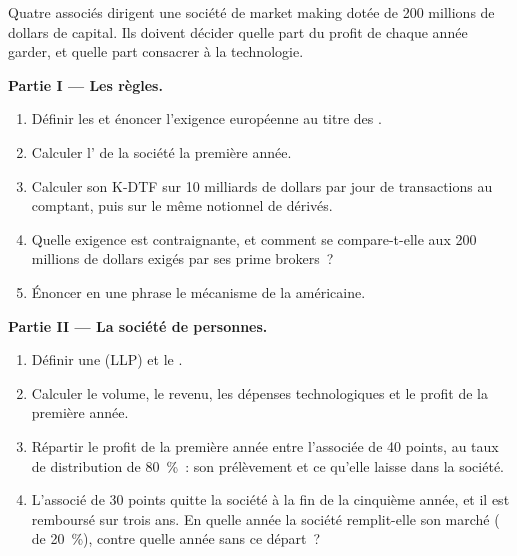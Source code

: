 \begin{problem}\label{pb:fm:the-proprietary-market-making-firm:1}
Quatre associés dirigent une société de market making dotée de 200 millions de dollars de capital. Ils doivent décider quelle part du profit de chaque année garder, et quelle part
consacrer à la technologie.

\medskip\noindent\textbf{Partie I --- Les règles.}
\begin{enumerate}
\item Définir les  et énoncer l'exigence européenne au titre des .
\item Calculer l' de la société la première année.
\item Calculer son K-DTF sur 10 milliards de dollars par jour de transactions au comptant, puis sur le même notionnel de dérivés.
\item Quelle exigence est contraignante, et comment se compare-t-elle aux 200 millions de dollars exigés par ses prime brokers~?
\item Énoncer en une phrase le mécanisme de la  américaine.
\end{enumerate}

\medskip\noindent\textbf{Partie II --- La société de personnes.}
\begin{enumerate}[resume]
\item Définir une  (LLP) et le .
\item Calculer le volume, le revenu, les dépenses technologiques et le profit de la première année.
\item Répartir le profit de la première année entre l'associée de 40 points, au taux de distribution de 80~\%~: son prélèvement et ce qu'elle laisse dans la société.
\item L'associé de 30 points quitte la société à la fin de la cinquième année, et il est remboursé sur trois ans. En quelle année la société remplit-elle son marché ( de 20~\%),
contre quelle année sans ce départ~?
\end{enumerate}


\end{problem}

